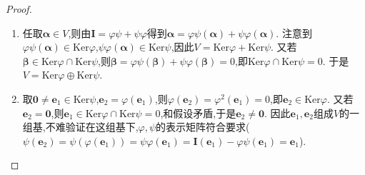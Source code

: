 \documentclass[../../main.tex]{subfiles}%
\begin{document}
\begin{proof}
\begin{enumerate}[(1)]
\item 任取\(\boldsymbol{\alpha}\in V\),则由\(\boldsymbol{I}=\varphi\psi+\psi\varphi\)得到\(\boldsymbol{\alpha}=\varphi\psi(\boldsymbol{\alpha})+\psi\varphi(\boldsymbol{\alpha})\). 注意到\(\varphi\psi(\boldsymbol{\alpha})\in\text{Ker}\varphi\),\(\psi\varphi(\boldsymbol{\alpha})\in\text{Ker}\psi\),因此\(V=\text{Ker}\varphi+\text{Ker}\psi\). 又若\(\boldsymbol{\beta}\in\text{Ker}\varphi\cap\text{Ker}\psi\),则\(\boldsymbol{\beta}=\varphi\psi(\boldsymbol{\beta})+\psi\varphi(\boldsymbol{\beta}) = 0\),即\(\text{Ker}\varphi\cap\text{Ker}\psi = 0\). 于是\(V=\text{Ker}\varphi\oplus\text{Ker}\psi\).

\item 取\(\boldsymbol{0}\neq\boldsymbol{e}_1\in\text{Ker}\psi\),\(\boldsymbol{e}_2 = \varphi(\boldsymbol{e}_1)\),则\(\varphi(\boldsymbol{e}_2)=\varphi^2(\boldsymbol{e}_1)=0\),即\(\boldsymbol{e}_2\in\text{Ker}\varphi\). 又若\(\boldsymbol{e}_2 = \boldsymbol{0}\),则\(\boldsymbol{e}_1\in\text{Ker}\varphi\cap\text{Ker}\psi = 0\),和假设矛盾,于是\(\boldsymbol{e}_2\neq\boldsymbol{0}\). 因此\(\boldsymbol{e}_1,\boldsymbol{e}_2\)组成\(V\)的一组基,不难验证在这组基下,\(\varphi,\psi\)的表示矩阵符合要求($\psi \left( \boldsymbol{e}_2 \right) =\psi \left( \varphi \left( \boldsymbol{e}_1 \right) \right) =\psi \varphi \left( \boldsymbol{e}_1 \right) =\boldsymbol{I}\left( \boldsymbol{e}_1 \right) -\varphi \psi \left( \boldsymbol{e}_1 \right) =\boldsymbol{e}_1$).


\end{enumerate}
\end{proof}
\end{document}
